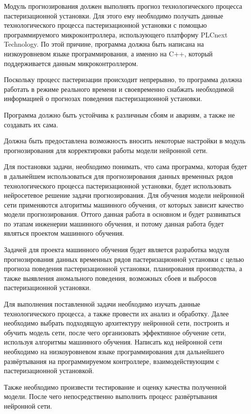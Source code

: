 {\gostFont

  \par \redline Модуль прогнозирования должен выполнять прогноз технологического процесса пастеризационной установки. Для этого ему необходимо получать данные технологического процесса пастеризационной установки с помощью программируемого микроконтроллера, использующего платформу PLCnext Technology. По этой причине, программа должна быть написана на низкоуровневом языке программирования, а именно на C++, который поддерживается данным микроконтроллером. 

  \par \redline Поскольку процесс пастеризации происходит непрерывно, то программа должна работать в режиме реального времени и своевременно снабжать необходимой информацией о прогнозах поведения пастеризационной установки. 

  \par \redline Программа должно быть устойчива к различным сбоям и авариям, а также не создавать их сама. 

  \par \redline Должна быть предоставлена возможность вносить некоторые настройки в модуль прогнозирования для корректировки работы модели нейронной сети. 

  \par \redline Для постановки задачи, необходимо понимать, что сама программа, которая будет в дальнейшем использоваться для прогнозирования данных временных рядов технологического процесса пастеризационной установки, будет использовать нейросетевое решение задачи прогнозирования. Для обучения модели нейронной сети применяются алгоритмы машинного обучения, от которых зависит качество модели прогнозирования. Оттого данная работа в основном и будет развиваться по этапам инженерии машинного обучения, и потому данная работа будет являться проектом машинного обучения. 

  \par \redline Задачей для проекта машинного обучения будет является разработка модуля прогнозирования данных временных рядов пастеризационной установки с целью прогноза поведения пастеризационной установки, планирования производства, а также выявления аномального поведения, возможных сбоев и выбросов пастеризационной установки. 

  \par \redline Для выполнения поставленной задачи необходимо изучать данные технологического процесса, а также провести их анализ и обработку. Далее необходимо выбрать подходящую архитектуру нейронной сети, построить и обучить модель сети, после чего организовать эффективное обучение сети, используя алгоритмы машинного обучения.  Написать код нейронной сети необходимо на низкоуровневом языке программирования для дальнейшего развёртывания на программируемом контроллере, взаимодействующим с пастеризационной установкой. 

  \par \redline Также необходимо произвести тестирование и оценку качества полученной модели. После чего непосредственно выполнить процесс развёртывания нейронной сети.  

  \par 
}
